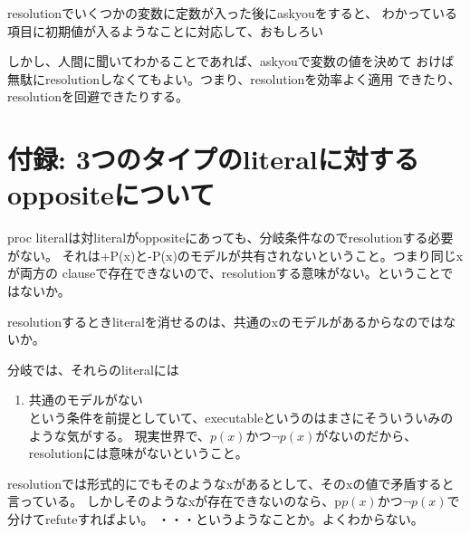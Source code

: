 \documentclass[10pt, onecolumn]{jarticle}   	%
\begin{document}
resolutionでいくつかの変数に定数が入った後にaskyouをすると、
わかっている項目に初期値が入るようなことに対応して、おもしろい

しかし、人間に聞いてわかることであれば、askyouで変数の値を決めて
おけば無駄にresolutionしなくてもよい。つまり、resolutionを効率よく適用
できたり、resolutionを回避できたりする。


\section{付録: 3つのタイプのliteralに対するoppositeについて}
proc literalは対literalがoppositeにあっても、分岐条件なのでresolutionする必要がない。
それは+P(x)と-P(x)のモデルが共有されないということ。つまり同じxが両方の
clauseで存在できないので、resolutionする意味がない。ということではないか。

resolutionするときliteralを消せるのは、共通のxのモデルがあるからなのではないか。

分岐では、それらのliteralには
\begin{enumerate}
\item 共通のモデルがない\\
という条件を前提としていて、executableというのはまさにそういういみのような気がする。
現実世界で、$p(x)かつ\neg p(x)$がないのだから、resolutionには意味がないということ。
\end{enumerate}

resolutionでは形式的にでもそのようなxがあるとして、そのxの値で矛盾すると言っている。
しかしそのようなxが存在できないのなら、p$p(x)かつ\neg p(x)$で分けてrefuteすればよい。
・・・というようなことか。よくわからない。
\end{document}
